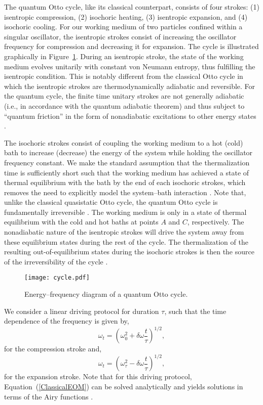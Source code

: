 \documentclass[preprints,article,accept,moreauthors,pdftex]{Definitions/mdpi}
\begin{document}
The quantum Otto cycle, like its classical counterpart, consists of four strokes: (1) isentropic compression, (2) isochoric heating, (3) isentropic expansion, and (4) isochoric cooling. For our working medium of two particles confined within a singular oscillator, the isentropic strokes consist of increasing the oscillator frequency for compression and decreasing it for expansion. {The cycle is illustrated graphically in Figure~\ref{cycleFig}.} During an isentropic stroke, the state of the working medium evolves unitarily with constant von Neumann entropy, thus fulfilling the isentropic condition. This is notably different from the classical Otto cycle in which the isentropic strokes are thermodynamically adiabatic and reversible. For the quantum cycle, the finite time unitary strokes are not generally adiabatic (i.e., in accordance with the quantum adiabatic theorem) and thus subject to ``quantum friction'' in the form of nonadiabatic excitations to other energy states \cite{Deffner2019book}.  

The isochoric strokes consist of coupling the working medium to a hot (cold) bath to increase (decrease) the energy of the system while holding the oscillator frequency constant. We make the standard assumption that the thermalization time is sufficiently short such that the working medium has achieved a state of thermal equilibrium with the bath by the end of each isochoric strokes, which removes the need to explicitly model the system--bath interaction \cite{Kosloff1984, Rezek2006, Abah2012, Campo2014, Beau2016, Abah2017, Myers2020, Watanabe2020, Myers2021}.  {Note that, unlike the classical quasistatic Otto cycle, the quantum Otto cycle is fundamentally irreversible \cite{Deffner2019book}. The working medium is only in a state of thermal equilibrium with the cold and hot baths at points $A$ and $C$, respectively. The nonadiabatic nature of the isentropic strokes will drive the system away from these equilibrium states during the rest of the cycle. The thermalization of the resulting out-of-equilibrium states during the isochoric strokes is then the source of the irreversibility of the cycle \cite{Deffner2019book}.}

\begin{figure}[H]
	\texttt{[image: cycle.pdf]}
	\caption{\label{cycleFig} Energy--frequency diagram of a quantum Otto cycle.}
\end{figure}

We consider a linear driving protocol for duration $\tau$, such that the time dependence of the frequency is given by,
\begin{equation}
	\omega_t = \left( \omega_0^2 + \delta\omega \frac{t}{\tau}\right)^{1/2}, 
\end{equation}
for the compression stroke and, 
\begin{equation}
	\omega_t = \left( \omega_{\tau}^2 - \delta\omega \frac{t}{\tau}\right)^{1/2}, 
\end{equation}
for the expansion stroke. Note that for this driving protocol, Equation~(\ref{ClassicalEOM}) can be solved analytically and yields solutions in terms of the Airy functions \cite{Deffner2008}.  
\end{document}
